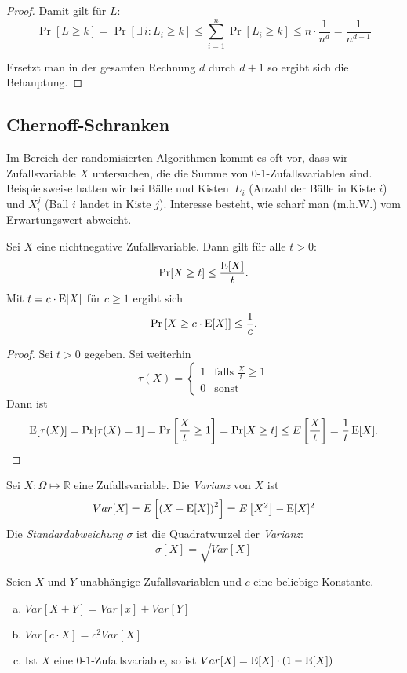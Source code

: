 \begin{proof}
	Damit gilt für $L$:
	\[
	  \Pr[L \geq k] = \Pr\left[ \exists\,i : L_i \geq k \right] \leq
	  \sum_{i=1}^n \Pr[L_i \geq k] \leq n \cdot \frac{1}{n^d} =
	  \frac{1}{n^{d-1}}
	\]

	Ersetzt man in der gesamten Rechnung $d$ durch $d+1$ so ergibt sich die
	Behauptung.
\end{proof}
\subsection{Chernoff-Schranken}
Im Bereich der randomisierten Algorithmen kommt es oft vor, dass wir
Zufallsvariable $X$ untersuchen, die die Summe von $0$-$1$-Zufallsvariablen
sind. Beispielsweise hatten wir bei \glqq Bälle und Kisten\grqq\ $L_i$ (Anzahl
der Bälle in Kiste $i$) und $X_i^j$ (Ball $i$ landet in Kiste $j$). Interesse
besteht, wie scharf man (m.h.W.) vom Erwartungswert abweicht.
\begin{satz}
	Sei $X$ eine nichtnegative Zufallsvariable. Dann gilt für alle $t > 0$:
	\[
	  \Pr[X \geq t] \leq \frac{\operatorname{E}[X]}{t}.
	\]
	Mit $t = c \cdot \operatorname{E}[X]$ für $c \geq 1$ ergibt sich
	\[
	  \Pr\left[X \geq c \cdot \operatorname{E}[X]\right] \leq \frac{1}{c}.
	\]
\end{satz}
\begin{proof}
	Sei $t > 0$ gegeben. Sei weiterhin 
	\[
	  \tau(X) = \begin{cases} 1 & \text{falls } \frac{X}{t} \geq 1 \\ 0 &
		  \text{sonst} \end{cases}
	\]
	Dann ist
	\[
	  \operatorname{E}[\tau(X)] = \Pr[\tau(X)=1] = \Pr\left[\frac{X}{t} \geq 1\right] = \Pr[X
	  \geq t] \leq E\left[\frac{X}{t}\right] = \frac{1}{t} \operatorname{E}[X].
	\]
\end{proof}
\begin{defn}
	Sei $X : \Omega \mapsto \mathbb{R}$ eine Zufallsvariable. Die \emph{Varianz} von $X$ ist
	\[
	  Var[X] = E\left[\left(X - \operatorname{E}[X]\right)^2 \right] = E\left[X^2\right] - \operatorname{E}[X]^2
	\]
	Die \emph{Standardabweichung} $\sigma$ ist die Quadratwurzel der \emph{Varianz}:
	\[
	  \sigma[X] = \sqrt{Var[X]}
	\]
\end{defn}
\begin{satz}
	Seien $X$ und $Y$ unabhängige Zufallsvariablen und $c$ eine beliebige Konstante.
	\begin{enumerate}[(a)]
		\item $Var[X+Y] = Var[x] + Var[Y]$
		\item $Var[c\cdot X] = c^2 Var[X]$
		\item Ist $X$ eine $0$-$1$-Zufallsvariable, so ist $Var[X] =
			\operatorname{E}[X] \cdot \left(1 - \operatorname{E}[X]\right)$
	\end{enumerate}
\end{satz}
